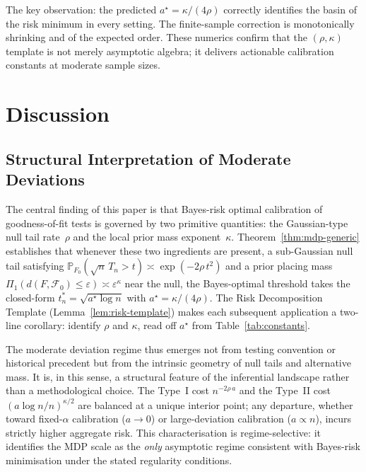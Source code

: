 \documentclass[11pt]{article}
\newcommand{\calF}{\mathcal{F}}
\newcommand{\rhotail}{\rho}  %
\newcommand{\1}{\mathbf{1}}
\newcommand{\PP}{\mathbb{P}}
\theoremstyle{plain}
\theoremstyle{definition}
\theoremstyle{remark}
\begin{document}
The key observation: the predicted $a^{\star}=\kappa/(4\rhotail)$ correctly identifies the basin of the risk minimum in every setting.
The finite-sample correction is monotonically shrinking and of the expected order.
These numerics confirm that the $(\rhotail,\kappa)$ template is not merely asymptotic algebra; it delivers actionable calibration constants at moderate sample sizes.


\section{Discussion}
\label{sec:discussion}


\subsection{Structural Interpretation of Moderate Deviations}

The central finding of this paper is that Bayes-risk optimal calibration of goodness-of-fit tests is governed by two primitive quantities: the Gaussian-type null tail rate~$\rhotail$ and the local prior mass exponent~$\kappa$.
Theorem~\ref{thm:mdp-generic} establishes that whenever these two ingredients are present, a sub-Gaussian null tail satisfying $\PP_{F_0}(\sqrt{n}\,T_n>t)\asymp\exp(-2\rhotail\,t^2)$ and a prior placing mass $\Pi_1(d(F,\calF_0)\le\varepsilon)\asymp\varepsilon^{\kappa}$ near the null, the Bayes-optimal threshold takes the closed-form $t_n^{*}=\sqrt{a^{\star}\log n}$ with $a^{\star}=\kappa/(4\rhotail)$.
The Risk Decomposition Template (Lemma~\ref{lem:risk-template}) makes each subsequent application a two-line corollary: identify $\rhotail$ and $\kappa$, read off $a^{\star}$ from Table~\ref{tab:constants}.

The moderate deviation regime thus emerges not from testing convention or historical precedent but from the intrinsic geometry of null tails and alternative mass.
It is, in this sense, a structural feature of the inferential landscape rather than a methodological choice.
The Type~I cost $n^{-2\rhotail\,a}$ and the Type~II cost $(a\log n/n)^{\kappa/2}$ are balanced at a unique interior point; any departure, whether toward fixed-$\alpha$ calibration ($a\to 0$) or large-deviation calibration ($a\propto n$), incurs strictly higher aggregate risk.
This characterisation is regime-selective: it identifies the MDP scale as the \emph{only} asymptotic regime consistent with Bayes-risk minimisation under the stated regularity conditions.
\end{document}
